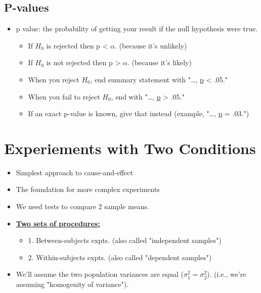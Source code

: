 \documentclass[11pt]{report}
\begin{document}
\subsection{P-values}
\begin{itemize}
    \item p value: the probability of getting your result if the null hypothesis were true. 
    \begin{itemize}
        \item If $H_0$ is rejected then p < $\alpha$. (because it's unlikely)
        \item If $H_0$ is not rejected then p > $\alpha$. (because it's likely)
        \item When you reject $H_0$, end summary statement with "\dots, \underline{p} < .05."
        \item When you fail to reject $H_0$, end with "\dots, \underline{p} > .05."
        \item If an exact p-value is known, give that instead (example, "\dots, \underline{p} = .03.")
    \end{itemize}
\end{itemize}

\section{Experiements with Two Conditions}
\begin{itemize}
    \item Simplest approach to cause-and-effect
    \item The foundation for more complex experiments
\end{itemize}

\begin{itemize}
    \item We need tests to compare 2 sample means.
    \item \underline{\textbf{Two sets of procedures:}}
    \begin{itemize}
        \item 1. Between-subjects expts. (also called "independent samples")
        \item 2. Within-subjects expts. (also called "dependent samples")
    \end{itemize}
    \item We'll assume the two population variances are equal ($\sigma_1^2 = \sigma_2^2$). (i.e., we're assuming "homogenity of variance").
\end{itemize}
\end{document}
